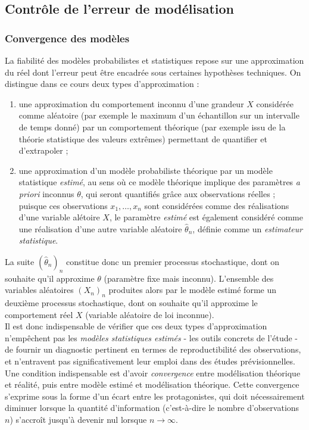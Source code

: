 
\subsection{Contr\^ole de l'erreur de mod\'elisation}\label{convergence}

\subsubsection*{Convergence des mod\`eles}\label{conv.modeles}

La fiabilit\'e des mod\`eles probabilistes et statistiques repose sur une approximation du r\'eel dont l'erreur peut \^etre encadr\'ee sous certaines hypoth\`eses techniques. On distingue dans ce cours deux types d'approximation  :
\begin{enumerate}
\item une approximation du comportement inconnu d'une grandeur $X$ consid\'er\'ee comme al\'eatoire (par exemple le maximum d'un \'echantillon sur un intervalle de temps donn\'e) par un comportement th\'eorique (par exemple issu de la th\'eorie statistique des valeurs extr\^emes) permettant de quantifier et d'extrapoler ;
\item une approximation d'un mod\`ele probabiliste th\'eorique par un mod\`ele statistique {\it estim\'e}, au sens o\`u ce mod\`ele th\'eorique implique des param\`etres {\it a priori} inconnus $\theta$, qui seront quantifi\'es grâce aux observations r\'eelles ; puisque ces observations $x_1,\ldots,x_n$ sont consid\'er\'ees comme des r\'ealisations d'une variable al\'etoire $X$, le param\`etre {\it estim\'e} est \'egalement consid\'er\'e comme une r\'ealisation d'une autre variable al\'eatoire $\hat\theta_n$, d\'efinie comme un {\it estimateur statistique}. 
\end{enumerate}
La suite $(\hat\theta_n)_n$ constitue donc un premier processus stochastique, dont on souhaite qu'il approxime  $\theta$ (param\`etre fixe mais inconnu). L'ensemble des variables al\'eatoires $(X_n)_n$ produites alors par le mod\`ele estim\'e forme un deuxi\`eme processus stochastique, dont on souhaite qu'il approxime le comportement r\'eel $X$ (variable al\'eatoire de loi inconnue).   \\
 
Il est donc indispensable de v\'erifier que ces deux types d'approximation n'emp\^echent pas les {\it mod\`eles statistiques estim\'es} - les outils concrets de l'\'etude - de fournir un diagnostic pertinent en termes de reproductibilit\'e des observations, et n'entravent pas significativement leur emploi dans des \'etudes pr\'evisionnelles. Une condition indispensable  est d'avoir {\it convergence} entre mod\'elisation th\'eorique et r\'ealit\'e, puis entre mod\`ele estim\'e et mod\'elisation th\'eorique. Cette convergence s'exprime sous la forme d'un \'ecart entre les protagonistes, qui doit n\'ecessairement diminuer lorsque la quantit\'e d'information (c'est-\`a-dire le nombre d'observations $n$) s'accro\^it jusqu'\`a devenir nul lorsque $n\to\infty$.  \\

